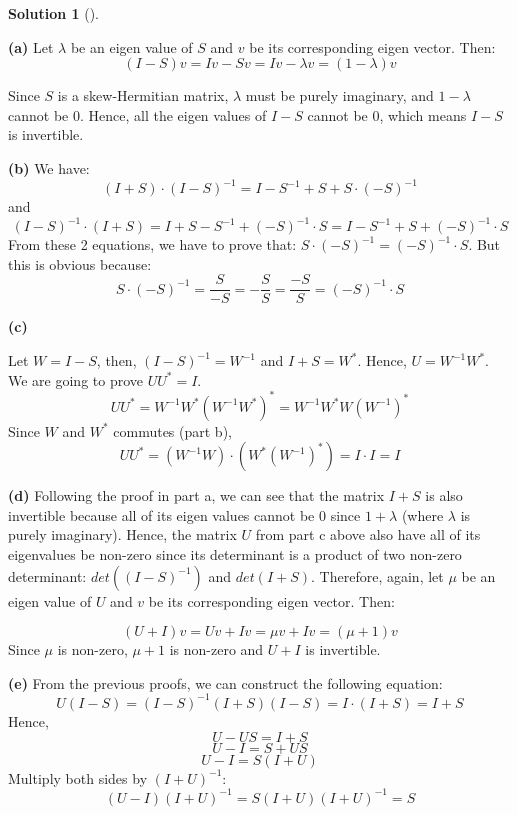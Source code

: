 \documentclass[numbers=enddot,12pt,final,onecolumn,notitlepage]{scrartcl}
\newcounter{sol}
\theoremstyle{definition}
\newtheorem{solu}[sol]{Solution}
\newenvironment{solution}[1][]
{\begin{solu}[#1]\begin{leftbar}}
        {\end{leftbar}\end{solu}}
\begin{document}
\begin{solution}
	\textbf{(a)}
	Let $\lambda$ be an eigen value of $S$ and $v$ be its corresponding eigen vector. Then:
	\[
		(I - S)v = Iv - Sv = Iv - \lambda v = (1 - \lambda) v
	\]

	Since $S$ is a skew-Hermitian matrix, $\lambda$ must be purely imaginary, and $1 - \lambda$ cannot be 0. Hence, all the eigen values of $I - S$ cannot be 0, which means $I - S$ is invertible.

	\textbf{(b)} We have:
	\[
		(I + S)\cdot(I - S)^{-1} = I - S^{-1} + S + S \cdot (-S)^{-1}
	\]
	and
	\[
		(I - S)^{-1}\cdot(I + S) = I + S - S^{-1} + (-S)^{-1} \cdot S = I - S^{-1} + S + (-S)^{-1} \cdot S
	\]
	From these 2 equations, we have to prove that: $S \cdot (-S)^{-1} = (-S)^{-1} \cdot S $. But this is obvious because:
	\[
		S \cdot (-S)^{-1} = \frac{S}{-S} = -\frac{S}{S} = \frac{-S}{S} = (-S)^{-1} \cdot S
	\]

	\textbf{(c)}

	Let $W = I - S$, then, $(I - S)^{-1} = W^{-1}$ and $I + S = W^{\ast}$. Hence, $U = W^{-1}W^{\ast}$. We are going to prove $UU^{\ast} = I$.
	\[
		UU^{\ast} = W^{-1}W^{\ast} (W^{-1}W^{\ast})^{\ast} = W^{-1}W^{\ast} W(W^{-1})^{\ast}
	\]
	Since $W$ and $W^{\ast}$ commutes (part b),
	\[
		UU^{\ast} = (W^{-1} W) \cdot (W^{\ast} (W^{-1})^{\ast}) = I \cdot I = I
	\]

	\textbf{(d)}
	Following the proof in part a, we can see that the matrix $I + S$ is also invertible because all of its eigen values cannot be 0 since $1 + \lambda$ (where $\lambda$ is purely imaginary). Hence, the matrix $U$ from part c above also have all of its eigenvalues be non-zero since its determinant is a product of two non-zero determinant: $det((I - S)^{-1})$ and $det(I + S)$. Therefore, again, let $\mu$ be an eigen value of $U$ and $v$ be its corresponding eigen vector. Then:

	\[
		(U + I)v = Uv + Iv = \mu v + Iv = (\mu + 1)v
	\]
	Since $\mu$ is non-zero, $\mu + 1$ is non-zero and $U + I$ is invertible.

	\textbf{(e)}
	From the previous proofs, we can construct the following equation:
	\[
		U (I - S) = (I - S)^{-1} (I + S) (I - S) = I \cdot (I + S) = I + S
	\]
	Hence,
	\[
		U - US = I + S
	\]
	\[
		U - I = S + US
	\]
	\[
		U - I = S(I + U)
	\]
	Multiply both sides by $(I + U)^{-1}$:
	\[
		(U - I)(I + U)^{-1} = S(I + U)(I + U)^{-1} = S
	\]

\end{solution}
\end{document}
